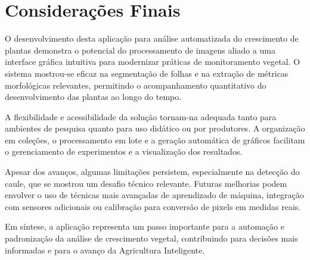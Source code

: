 \chapter{Considerações Finais}

O desenvolvimento desta aplicação para análise automatizada do crescimento de plantas demonstra o potencial do processamento de imagens aliado a uma interface gráfica intuitiva para modernizar práticas de monitoramento vegetal. O sistema mostrou-se eficaz na segmentação de folhas e na extração de métricas morfológicas relevantes, permitindo o acompanhamento quantitativo do desenvolvimento das plantas ao longo do tempo.

A flexibilidade e acessibilidade da solução tornam-na adequada tanto para ambientes de pesquisa quanto para uso didático ou por produtores. A organização em coleções, o processamento em lote e a geração automática de gráficos facilitam o gerenciamento de experimentos e a visualização dos resultados.

Apesar dos avanços, algumas limitações persistem, especialmente na detecção do caule, que se mostrou um desafio técnico relevante. Futuras melhorias podem envolver o uso de técnicas mais avançadas de aprendizado de máquina, integração com sensores adicionais ou calibração para conversão de pixels em medidas reais.

Em síntese, a aplicação representa um passo importante para a automação e padronização da análise de crescimento vegetal, contribuindo para decisões mais informadas e para o avanço da Agricultura Inteligente.

